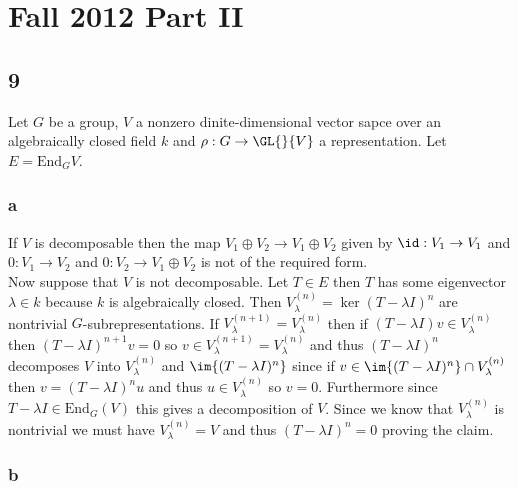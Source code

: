 \documentclass[12pt]{article}
\begin{document}
\section{Fall 2012 Part II}

\subsection{9}

Let $G$ be a group, $V$ a nonzero dinite-dimensional vector sapce over an algebraically closed field $k$ and $\rho : G \to \GL{}{V}$ a representation. Let $E = \mathrm{End}_G{V}$. 

\subsubsection{a}

If $V$ is decomposable then the map $V_1 \oplus V_2 \to V_1 \oplus V_2$ given by $\id : V_1 \to V_1$ and $0 : V_1 \to V_2$ and $0 : V_2 \to V_1 \oplus V_2$ is not of the required form. 
\bigskip\\
Now suppose that $V$ is not decomposable. Let $T \in E$ then $T$ has some eigenvector $\lambda \in k$ because $k$ is algebraically closed. Then $V_\lambda^{(n)} = \ker{(T - \lambda I)^n}$ are nontrivial $G$-subrepresentations. If $V_\lambda^{(n+1)} = V_\lambda^{(n)}$ then if $(T - \lambda I) v \in V_\lambda^{(n)}$ then $(T - \lambda I)^{n+1} v = 0$ so $v \in V_\lambda^{(n+1)} = V_\lambda^{(n)}$ and thus $(T - \lambda I)^n$ decomposes $V$ into $V_\lambda^{(n)}$ and $\im{(T - \lambda I)^n}$ since if $v \in \im{(T - \lambda I)^n} \cap V_\lambda^{(n)}$ then $v = (T - \lambda I)^n u$ and thus $u \in V_\lambda^{(n)}$ so $v = 0$. Furthermore since $T - \lambda I \in \mathrm{End}_{G}(V)$ this gives a decomposition of $V$. Since we know that $V_\lambda^{(n)}$ is nontrivial we must have $V_\lambda^{(n)} = V$ and thus $(T - \lambda I)^n = 0$ proving the claim.

\subsubsection{b}
\end{document}
